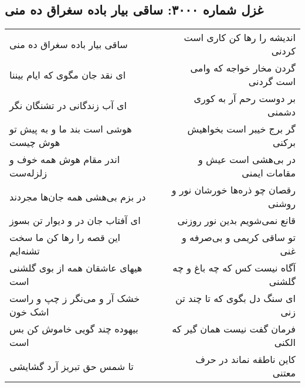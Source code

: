 \begin{center}
\section*{غزل شماره ۳۰۰۰: ساقی بیار باده سغراق ده منی}
\label{sec:3000}
\begin{longtable}{l p{0.5cm} r}
ساقی بیار باده سغراق ده منی
&&
اندیشه را رها کن کاری است کردنی
\\
ای نقد جان مگوی که ایام بیننا
&&
گردن مخار خواجه که وامی است گردنی
\\
ای آب زندگانی در تشنگان نگر
&&
بر دوست رحم آر به کوری دشمنی
\\
هوشی است بند ما و به پیش تو هوش چیست
&&
گر برج خیبر است بخواهیش برکنی
\\
اندر مقام هوش همه خوف و زلزله‌ست
&&
در بی‌هشی است عیش و مقامات ایمنی
\\
در بزم بی‌هشی همه جان‌ها مجردند
&&
رقصان چو ذره‌ها خورشان نور و روشنی
\\
ای آفتاب جان در و دیوار تن بسوز
&&
قانع نمی‌شویم بدین نور روزنی
\\
این قصه را رها کن ما سخت تشنه‌ایم
&&
تو ساقی کریمی و بی‌صرفه و غنی
\\
هیهای عاشقان همه از بوی گلشنی است
&&
آگاه نیست کس که چه باغ و چه گلشنی
\\
خشک آر و می‌نگر ز چپ و راست اشک خون
&&
ای سنگ دل بگوی که تا چند تن زنی
\\
بیهوده چند گویی خاموش کن بس است
&&
فرمان گفت نیست همان گیر که الکنی
\\
تا شمس حق تبریز آرد گشایشی
&&
کاین ناطقه نماند در حرف معتنی
\\
\end{longtable}
\end{center}
